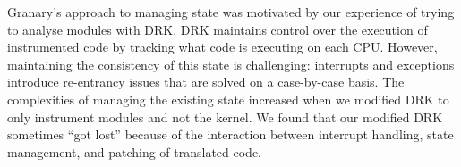 \documentclass{sigplanconf}
\begin{document}
Granary's approach to managing state was motivated by our experience of trying to analyse modules with DRK. DRK maintains control over the execution of instrumented code by tracking what code is executing on each CPU. However, maintaining the consistency of this state is challenging: interrupts and exceptions introduce re-entrancy issues that are solved on a case-by-case basis. The complexities of managing the existing state increased when we modified DRK to only instrument modules and not the kernel. We found that our modified DRK sometimes ``got lost'' because of the interaction between interrupt handling, state management, and patching of translated code.

\end{document}
